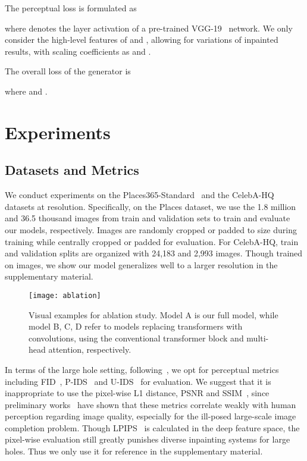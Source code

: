 \documentclass[10pt,twocolumn,letterpaper]{article}
\begin{document}
	\vspace{0.08in}
	The perceptual loss is formulated as
	
	where  denotes the layer activation of a pre-trained VGG-19~\cite{Simonyan15} network. We only consider the high-level features of  and , allowing for variations of inpainted results, with scaling coefficients  as  and .
	
	\vspace{0.08in}
	The overall loss of the generator is
	
	where  and .
	
\section{Experiments}
	\label{sec:exp}
	
	\subsection{Datasets and Metrics}
	We conduct experiments on the Places365-Standard~\cite{zhou2017places} and the CelebA-HQ~\cite{karras2018progressive} datasets at  resolution. Specifically, on the Places dataset, we use the 1.8 million and 36.5 thousand images from train and validation sets to train and evaluate our models, respectively. Images are randomly cropped or padded to  size during training while centrally cropped or padded for evaluation. For CelebA-HQ, train and validation splits are organized with 24,183 and 2,993 images. Though trained on  images, we show our model generalizes well to a larger resolution in the supplementary material.
		
	\begin{figure*}[t]
		\begin{center}
			\texttt{[image: ablation]}
		\end{center}
		\vspace{-0.2in}
		\caption{Visual examples for ablation study. Model A is our full model, while model B, C, D refer to models replacing transformers with convolutions, using the conventional transformer block and multi-head attention, respectively.}
		\label{fig:ablation}
		\vspace{-0.1in}
	\end{figure*}
	
	In terms of the large hole setting, following~\cite{zhao2020large}, we opt for perceptual metrics including FID~\cite{heusel2017gans}, P-IDS~\cite{zhao2020large} and U-IDS~\cite{zhang2018unreasonable} for evaluation. We suggest that it is inappropriate to use the pixel-wise L1 distance, PSNR and SSIM~\cite{wang2004image}, since preliminary works~\cite{ledig2017photo,sajjadi2017enhancenet} have shown that these metrics correlate weakly with human perception regarding image quality, especially for the ill-posed large-scale image completion problem. Though LPIPS~\cite{zhang2018unreasonable} is calculated in the deep feature space, the pixel-wise evaluation still greatly punishes diverse inpainting systems for large holes. Thus we only use it for reference in the supplementary material. 
\end{document}

